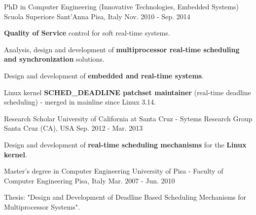 

\begin{cventries}

  \cventry
    {PhD in Computer Engineering (Innovative Technologies, Embedded Systems)} %
    {Scuola Superiore Sant'Anna} %
    {Pisa, Italy} %
    {Nov. 2010 - Sep. 2014} %
    {
      \begin{cvitems} %
        \item {\textbf{Quality of Service} control for soft real-time systems.}
	\item {Analysis, design and development of \textbf{multiprocessor real-time scheduling
		and synchronization} solutions.}
	\item {Design and development of \textbf{embedded and real-time systems}.}
	\item {Linux kernel \textbf{SCHED\_DEADLINE patchset maintainer} (real-time
		deadline scheduling) - merged in mainline since Linux 3.14.}
      \end{cvitems}
    }

  \cventry
    {Research Scholar} %
    {University of California at Santa Cruz - Sytems Research Group} %
    {Santa Cruz (CA), USA} %
    {Sep. 2012 - Mar. 2013} %
    {
      \begin{cvitems} %
	\item {Design and development of \textbf{real-time scheduling
		mechanisms} for the \textbf{Linux kernel}.}
      \end{cvitems}
    }

  \cventry
    {Master's degree in Computer Engineering} %
    {University of Pisa - Faculty of Computer Engineering} %
    {Pisa, Italy} %
    {Mar. 2007 - Jun. 2010} %
    {
      \begin{cvitems} %
	\item {Thesis: "Design and Development of Deadline Based Scheduling
		Mechanisms for Multiprocessor Systems".}
      \end{cvitems}
    }


\end{cventries}
